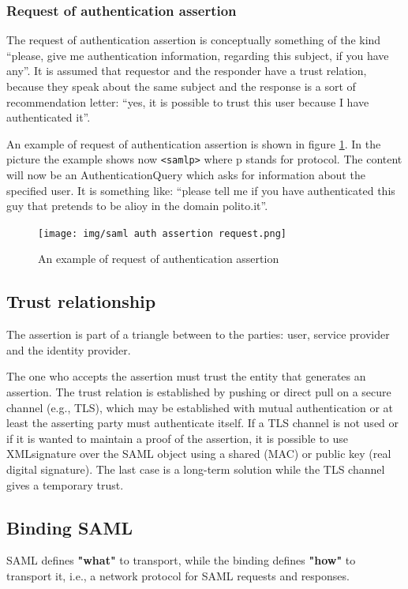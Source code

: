\subsubsection{Request of authentication assertion}
The request of authentication assertion is conceptually something of
the kind “please, give me authentication information, regarding this
subject, if you have any”. It is assumed that requestor and the
responder have a trust relation, because they speak about the same
subject and the response is a sort of recommendation letter: “yes, it
is possible to trust this user because I have authenticated it”.

An example of request of authentication assertion is shown in figure 
\ref{fig:saml-auth-assertion-request}.
In the picture the example shows now \texttt{<samlp>} where p
stands for protocol. The content will now be an AuthenticationQuery
which asks for information about the specified user. It is something
like: “please tell me if you have authenticated this guy that pretends
to be alioy in the domain polito.it”.

\begin{figure}[H]
  \centering
  \texttt{[image: img/saml auth assertion
  request.png]}
  \caption{An example of request of authentication assertion}
  \label{fig:saml-auth-assertion-request}
\end{figure}

\subsection{Trust relationship}
The assertion is part of a triangle between to the parties: user, service
provider and the identity provider. 

The one who accepts the assertion must trust the entity that generates
an assertion. The trust relation is established by pushing or direct
pull on a secure channel (e.g., TLS), which may be established with
mutual authentication or at least the asserting party must
authenticate itself. If a TLS channel is not used or if it is wanted
to maintain a proof of the assertion, it is possible to use
XMLsignature over the SAML object using a shared (MAC) or public key
(real digital signature). The last case is a long-term solution while
the TLS channel gives a temporary trust.

\subsection{Binding SAML}
SAML defines \textbf{"what"} to transport, while the binding defines
\textbf{"how"} to transport it, i.e., a network protocol for SAML
requests and responses.

